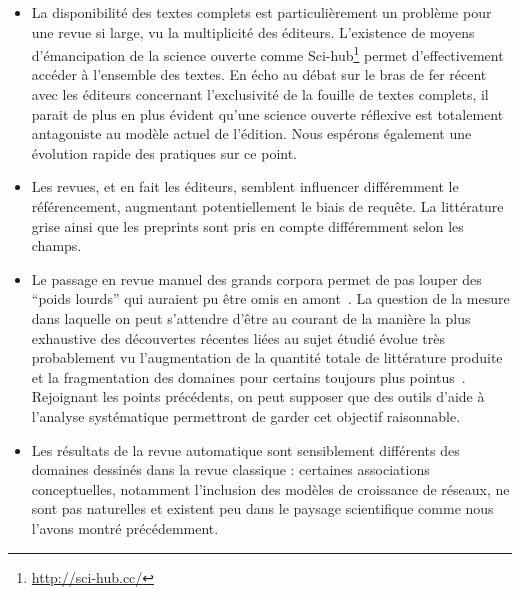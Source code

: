 {\begin{itemize}
\item La disponibilité des textes complets est particulièrement un problème pour une revue si large, vu la multiplicité des éditeurs. L'existence de moyens d'émancipation de la science ouverte comme Sci-hub\footnote{\url{http://sci-hub.cc/}} permet d'effectivement accéder à l'ensemble des textes. En écho au débat sur le bras de fer récent avec les éditeurs concernant l'exclusivité de la fouille de textes complets, il parait de plus en plus évident qu'une science ouverte réflexive est totalement antagoniste au modèle actuel de l'édition. Nous espérons également une évolution rapide des pratiques sur ce point.
\item Les revues, et en fait les éditeurs, semblent influencer différemment le référencement, augmentant potentiellement le biais de requête. La littérature grise ainsi que les preprints sont pris en compte différemment selon les champs.
\item Le passage en revue manuel des grands corpora permet de pas louper des ``poids lourds'' qui auraient pu être omis en amont~\cite{lissacksubliminal}. La question de la mesure dans laquelle on peut s'attendre d'être au courant de la manière la plus exhaustive des découvertes récentes liées au sujet étudié évolue très probablement vu l'augmentation de la quantité totale de littérature produite et la fragmentation des domaines pour certains toujours plus pointus~\cite{bastian2010seventy}. Rejoignant les points précédents, on peut supposer que des outils d'aide à l'analyse systématique permettront de garder cet objectif raisonnable.
\item Les résultats de la revue automatique sont sensiblement différents des domaines dessinés dans la revue classique : certaines associations conceptuelles, notamment l'inclusion des modèles de croissance de réseaux, ne sont pas naturelles et existent peu dans le paysage scientifique comme nous l'avons montré précédemment.
\end{itemize}
}




